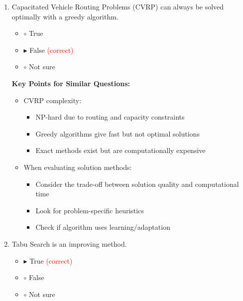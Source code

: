 \begin{enumerate}[label=\alph*)]
\item Capacitated Vehicle Routing Problems (CVRP) can always be solved optimally with a greedy algorithm.
\begin{itemize}
\item $\circ$ True
\item $\blacktriangleright$ False \hspace{1em} \textcolor{red}{(correct)}
\item $\circ$ Not sure
\end{itemize}

\textbf{Key Points for Similar Questions:}
\begin{itemize}
\item CVRP complexity:
  \begin{itemize}
  \item NP-hard due to routing and capacity constraints
  \item Greedy algorithms give fast but not optimal solutions
  \item Exact methods exist but are computationally expensive
  \end{itemize}
\item When evaluating solution methods:
  \begin{itemize}
  \item Consider the trade-off between solution quality and computational time
  \item Look for problem-specific heuristics
  \item Check if algorithm uses learning/adaptation
  \end{itemize}
\end{itemize}

\item Tabu Search is an improving method.
\begin{itemize}
\item $\blacktriangleright$ True \hspace{1em} \textcolor{red}{(correct)}
\item $\circ$ False
\item $\circ$ Not sure
\end{itemize}


\end{enumerate}
